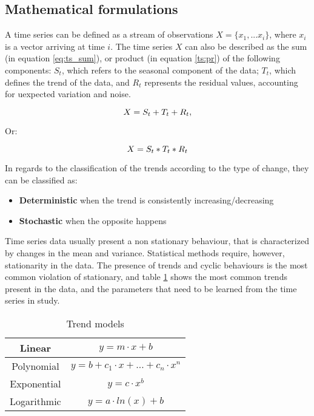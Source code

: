 \subsection{Mathematical formulations} \label{sec:math_form}

A time series can be defined as a stream of observations $X = \{x_1, ... x_i\}$, where $x_i$ is a vector arriving at time $i$. The time series $X$ can also be
described as the sum (in equation \ref{eq:ts_sum}), or product (in equation \ref{ts:pr}) of the following components: $S_t$, which refers to the seasonal component
of the data; $T_t$, which defines the trend of the data, and $R_t$ represents the residual values, accounting for uexpected variation and noise.

\begin {equation}
\centering
X = S_t + T_t + R_t
\label{eq:ts_sum},
\end {equation}

Or:

\begin {equation}
\centering
X = S_t * T_t * R_t
\label{ts:pr}
\end {equation}

\par In regards to the classification of the trends according to the type of change, they can be classified as:

\begin {itemize}
  \item \textbf {Deterministic} when the trend is consistently increasing/decreasing
  \item \textbf {Stochastic} when the opposite happens
\end {itemize}

\par Time series data usually present a non stationary behaviour, that is characterized by changes in the mean and variance. Statistical methods require, however,
stationarity in the data. The presence of trends and cyclic behaviours is the most common violation of stationary, and table \ref{tab:trends_here} shows the most 
common trends present in the data, and the parameters that need to be learned from the time series in study. 

\begin{table}[h]
\centering
\begin{tabular}{c|c}
Linear      & $y = m \cdot x + b$ \\ \hline
Polynomial  & $y = b + c_1 \cdot x + \dotso + c_n \cdot x^n$  \\ \hline
Exponential & $y = c \cdot  x^b$     \\ \hline
Logarithmic & $y = a \cdot ln(x) + b$
\end{tabular}
\caption{Trend models}
\label{tab:trends_here}
\end{table}

